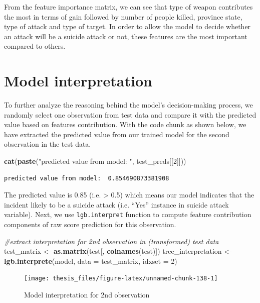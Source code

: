 \documentclass[11pt,oneside,a4paper]{reedthesis}
\newenvironment{Shaded}{\begin{snugshade}}{\end{snugshade}}
\newcommand{\KeywordTok}[1]{\textcolor[rgb]{0.13,0.29,0.53}{\textbf{#1}}}
\newcommand{\DataTypeTok}[1]{\textcolor[rgb]{0.13,0.29,0.53}{#1}}
\newcommand{\DecValTok}[1]{\textcolor[rgb]{0.00,0.00,0.81}{#1}}
\newcommand{\StringTok}[1]{\textcolor[rgb]{0.31,0.60,0.02}{#1}}
\newcommand{\CommentTok}[1]{\textcolor[rgb]{0.56,0.35,0.01}{\textit{#1}}}
\newcommand{\NormalTok}[1]{#1}
\begin{document}
From the feature importance matrix, we can see that type of weapon
contributes the most in terms of gain followed by number of people
killed, province state, type of attack and type of target. In order to
allow the model to decide whether an attack will be a suicide attack or
not, these features are the most important compared to others.

\section{Model interpretation}\label{model-interpretation}

To further analyze the reasoning behind the model's decision-making
process, we randomly select one observation from test data and compare
it with the predicted value based on features contribution. With the
code chunk as shown below, we have extracted the predicted value from
our trained model for the second observation in the test data.
\begin{Shaded}
\begin{Highlighting}[]
\KeywordTok{cat}\NormalTok{(}\KeywordTok{paste}\NormalTok{(}\StringTok{"predicted value from model: "}\NormalTok{, test_preds[[}\DecValTok{2}\NormalTok{]]))}
\end{Highlighting}
\end{Shaded}
\begin{verbatim}
predicted value from model:  0.854690873381908
\end{verbatim}
The predicted value is 0.85 (i.e. \textgreater{} 0.5) which means our
model indicates that the incident likely to be a suicide attack (i.e.
``Yes'' instance in suicide attack variable). Next, we use
\texttt{lgb.interpret} function to compute feature contribution
components of raw score prediction for this observation.
\begin{Shaded}
\begin{Highlighting}[]
\CommentTok{#extract interpretation for 2nd observation in (transformed) test data}
\NormalTok{test_matrix <-}\StringTok{ }\KeywordTok{as.matrix}\NormalTok{(test[, }\KeywordTok{colnames}\NormalTok{(test)])}
\NormalTok{tree_interpretation <-}\StringTok{ }\KeywordTok{lgb.interprete}\NormalTok{(model, }\DataTypeTok{data =}\NormalTok{ test_matrix, }\DataTypeTok{idxset =} \DecValTok{2}\NormalTok{)}
\end{Highlighting}
\end{Shaded}
\begin{figure}
\texttt{[image: thesis\_files/figure-latex/unnamed-chunk-138-1]} \caption{Model interpretation for 2nd observation}\label{fig:unnamed-chunk-138}
\end{figure}
\end{document}
